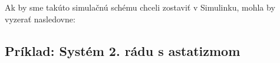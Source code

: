 \documentclass[a4paper, 10pt, ]{article}
\begin{document}
\noindent
Ak by sme takúto simulačnú schému chceli zostaviť v Simulinku, mohla by vyzerať nasledovne:

\begin{centering}


    \vspace{-2mm}

    \figcaption{}

    \vspace{2mm}

    \label{ar04_ss1r_adapt}

\end{centering}















\subsection{Príklad: Systém 2. rádu s astatizmom}
\label{Systém 2. rádu s astatizmom -- príklad}
\end{document}
